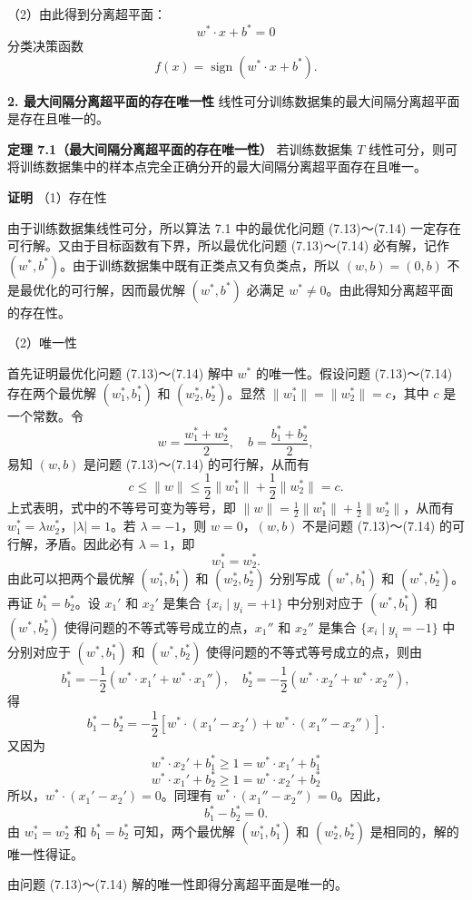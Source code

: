 \documentclass[UTF8,12pt,a4paper,fontset=fandol]{ctexart}
\begin{document}
（2）由此得到分离超平面：
\[
w^*\cdot x+b^*=0
\]
分类决策函数
\[
f(x)=\operatorname{sign}(w^*\cdot x+b^*).
\]

\noindent\textbf{2. 最大间隔分离超平面的存在唯一性}\quad
线性可分训练数据集的最大间隔分离超平面是存在且唯一的。

\noindent\textbf{定理 7.1（最大间隔分离超平面的存在唯一性）}\quad
若训练数据集 $T$ 线性可分，则可将训练数据集中的样本点完全正确分开的最大间隔分离超平面存在且唯一。

\noindent\textbf{证明}\quad
（1）存在性

由于训练数据集线性可分，所以算法 7.1 中的最优化问题 (7.13)～(7.14) 一定存在可行解。又由于目标函数有下界，所以最优化问题 (7.13)～(7.14) 必有解，记作 $(w^*,b^*)$。由于训练数据集中既有正类点又有负类点，所以 $(w,b)=(0,b)$ 不是最优化的可行解，因而最优解 $(w^*,b^*)$ 必满足 $w^*\neq 0$。由此得知分离超平面的存在性。

（2）唯一性

首先证明最优化问题 (7.13)～(7.14) 解中 $w^*$ 的唯一性。假设问题 (7.13)～(7.14) 存在两个最优解 $(w_1^*,b_1^*)$ 和 $(w_2^*,b_2^*)$。显然 $\|w_1^*\|=\|w_2^*\|=c$，其中 $c$ 是一个常数。令
\[
w=\frac{w_1^*+w_2^*}{2},\quad b=\frac{b_1^*+b_2^*}{2},
\]
易知 $(w,b)$ 是问题 (7.13)～(7.14) 的可行解，从而有
\[
c\leq \|w\|\leq \frac{1}{2}\|w_1^*\|+\frac{1}{2}\|w_2^*\|=c.
\]
上式表明，式中的不等号可变为等号，即 $\|w\|=\frac{1}{2}\|w_1^*\|+\frac{1}{2}\|w_2^*\|$，从而有 $w_1^*=\lambda w_2^*$，$|\lambda|=1$。若 $\lambda=-1$，则 $w=0$，$(w,b)$ 不是问题 (7.13)～(7.14) 的可行解，矛盾。因此必有 $\lambda=1$，即
\[
w_1^*=w_2^*.
\]
由此可以把两个最优解 $(w_1^*,b_1^*)$ 和 $(w_2^*,b_2^*)$ 分别写成 $(w^*,b_1^*)$ 和 $(w^*,b_2^*)$。再证 $b_1^*=b_2^*$。设 $x_1'$ 和 $x_2'$ 是集合 $\{x_i\mid y_i=+1\}$ 中分别对应于 $(w^*,b_1^*)$ 和 $(w^*,b_2^*)$ 使得问题的不等式等号成立的点，$x_1''$ 和 $x_2''$ 是集合 $\{x_i\mid y_i=-1\}$ 中分别对应于 $(w^*,b_1^*)$ 和 $(w^*,b_2^*)$ 使得问题的不等式等号成立的点，则由
\[
b_1^*=-\frac{1}{2}(w^*\cdot x_1'+w^*\cdot x_1''),\quad
b_2^*=-\frac{1}{2}(w^*\cdot x_2'+w^*\cdot x_2''),
\]
得
\[
b_1^*-b_2^*=-\frac{1}{2}\left[w^*\cdot(x_1'-x_2')+w^*\cdot(x_1''-x_2'')\right].
\]
又因为
\[
w^*\cdot x_2'+b_1^*\geq 1=w^*\cdot x_1'+b_1^*
\]
\[
w^*\cdot x_1'+b_2^*\geq 1=w^*\cdot x_2'+b_2^*
\]
所以，$w^*\cdot(x_1'-x_2')=0$。同理有 $w^*\cdot(x_1''-x_2'')=0$。因此，
\[
b_1^*-b_2^*=0.
\]
由 $w_1^*=w_2^*$ 和 $b_1^*=b_2^*$ 可知，两个最优解 $(w_1^*,b_1^*)$ 和 $(w_2^*,b_2^*)$ 是相同的，解的唯一性得证。

由问题 (7.13)～(7.14) 解的唯一性即得分离超平面是唯一的。
\end{document}
